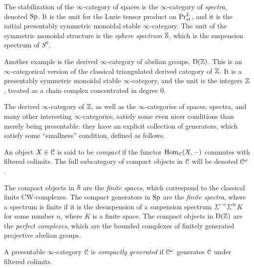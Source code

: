 \begin{example}
    The stabilization of the $\infty$-category of spaces is the $\infty$-category of \emph{spectra}, denoted $\Sp$. It is the unit for the Lurie tensor product on $\PrLs$, and it is the initial presentably symmetric monoidal stable $\infty$-category. The unit of the symmetric monoidal structure is the \emph{sphere spectrum} $\S$, which is the suspension spectrum of $S^0$.  
\end{example}

\begin{example}
    Another example is the derived $\infty$-category of abelian groups, $\Der(\Z)$. This is an $\infty$-categorical version of the classical triangulated derived category of $\Z$. It is a presentably symmetric monoidal stable $\infty$-category, and the unit is the integers $\Z$, treated as a chain complex concentrated in degree $0$. 
\end{example}

The derived $\infty$-category of $\Z$, as well as the $\infty$-categories of spaces, spectra, and many other interesting $\infty$-categories, satisfy some even nicer conditions than merely being presentable: they have an explicit collection of generators, which satisfy some ``smallness'' condition, defined as follows. 

\begin{definition}
    \label{ch0:def:compact-object}
    An object $X\in \C$ is said to be \emph{compact} if the functor $\Hom_\C(X,-)$ commutes with filtered colimits. The full subcategory of compact objects in $\C$ will be denoted $\Co$.
\end{definition}

\begin{example}
    The compact objects in $\Spaces$ are the \emph{finite spaces}, which correspond to the classical finite CW-complexes. The compact generators in $\Sp$ are the \emph{finite spectra}, where a spectrum is finite if it is the desuspension of a suspension spectrum $\Sigma^{-n}\Sigma^\infty K$ for some number $n$, where $K$ is a finite space. The compact objects in $\Der(\Z)$ are the \emph{perfect complexes}, which are the bounded complexes of finitely generated projective abelian groups. 
\end{example}

\begin{definition}
    \label{ch0:def:compactly-generated-category}
    A presentable $\infty$-category $\C$ is \emph{compactly generated} if $\Co$ generates $\C$ under filtered colimits. 
\end{definition}

